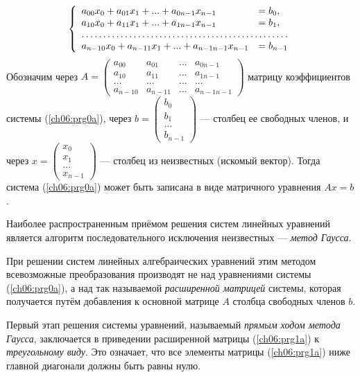 \begin{equation}\label{ch06:prg0a}
\left\{\begin{array}{ll}
a_{00}x_0+a_{01}x_1+...+a_{0n-1}x_{n-1}&=b_0,\\
a_{10}x_0+a_{11}x_1+...+a_{1n-1}x_{n-1}&=b_1,\\
\hdotsfor{2}\\
a_{n-10}x_0+a_{n-11}x_1+...+a_{n-1n-1}x_{n-1}&=b_{n-1}
\end{array}\right.
\end{equation}
Обозначим через 
$A=\left(\begin{matrix}
a_{00}&a_{01}&...&a_{0n-1}\\
a_{10}&a_{11}&...&a_{1n-1}\\
...&...&...&...\\
a_{n-10}&a_{n-11}&...&a_{n-1n-1}
\end{matrix}\right)$
матрицу коэффициентов системы (\ref{ch06:prg0a}), через 
$b=\left(\begin{matrix}b_0\\b_1\\...\\b_{n-1}\end{matrix}\right)$ --- столбец ее свободных членов, и через
$x=\left(\begin{matrix}x_0\\x_1\\...\\x_{n-1}\end{matrix}\right)$ --- столбец из неизвестных (искомый вектор). Тогда
система (\ref{ch06:prg0a})  может быть записана в виде матричного уравнения  $Ax=b$.

Наиболее распространенным приёмом решения систем линейных уравнений является алгоритм последовательного исключения неизвестных --- \emph{метод Гаусса}.

При решении систем линейных алгебраических уравнений этим методом всевозможные преобразования производят не над
уравнениями системы (\ref{ch06:prg0a}), а над так называемой \emph{расширенной матрицей} системы, которая получается
путём добавления к основной матрице $A$ столбца свободных членов $b$.

Первый этап решения системы уравнений, называемый \emph{прямым ходом метода Гаусса}, заключается в приведении
расширенной матрицы (\ref{ch06:prg1a}) к \emph{треугольному виду}. Это означает, что все элементы матрицы
(\ref{ch06:prg1a}) ниже главной диагонали должны быть равны нулю.

